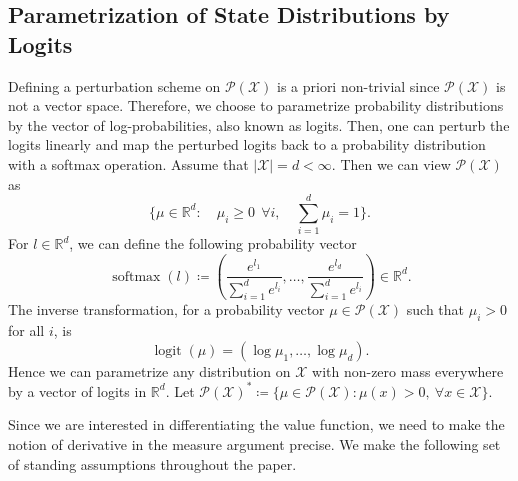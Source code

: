 \documentclass[11pt]{article}
\numberwithin{equation}{section}
\theoremstyle{definition}
\theoremstyle{remark}
\def\cP{\mathcal{P}}
\def\cX{\mathcal{X}}
\def\R{{\mathbb R}}
\DeclareMathOperator*{\logit}{logit}
\DeclareMathOperator*{\softmax}{softmax}
\begin{document}
\subsection{Parametrization of State Distributions by Logits}
\label{subsection:logits}

Defining a perturbation scheme on $\cP(\cX)$ is a priori non-trivial since $\cP(\cX)$ is not a vector space.
Therefore, we choose to parametrize probability distributions by the vector of log-probabilities, also known as logits. Then, one can perturb the logits linearly and map the perturbed logits back to a probability distribution with a softmax operation.
Assume that  $| \cX | = d < \infty$. Then we can view $\mathcal P (\cX)$ as
\[
\{ \mu \in \R^d: \quad \mu_i \geq 0\:\: \forall i, \quad \sum_{i = 1}^d \mu_i = 1\}.
\]
For $l \in \R^{d}$, we can define the following probability vector 
$$
\softmax (l) \coloneq \left( \frac{e^{l_1}}{\sum_{i=1}^{d} e^{l_i}}, \ldots, \frac{e^{l_{d}}}{\sum_{i=1}^{d} e^{l_i}}  \right) \in \R^{d}.
$$
 The inverse transformation, for a probability vector $\mu \in \mathcal{P}(\cX)$ such that $\mu_i > 0$ for all $i$, is
$$
\logit(\mu) = \left(\log \mu_1, \ldots, \log \mu_{d} \right).
$$
Hence we can parametrize any distribution on $\cX$ with non-zero mass everywhere by a vector of logits in $\R^{d}$.
 Let $ \cP(\cX)^* \coloneq \{ \mu \in \mathcal P (\cX): \mu(x) > 0, \: \forall x \in \cX \}$. 

Since we are interested in differentiating the value function, we need to make the notion of derivative in the measure argument precise. We make the following set of standing assumptions throughout the paper.
\end{document}
